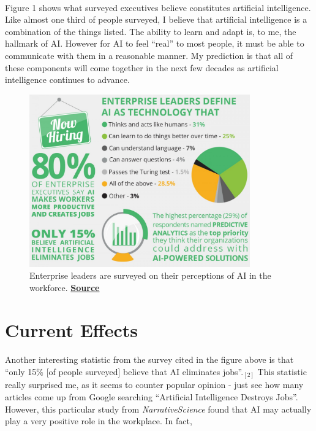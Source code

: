 \documentclass{article}
\begin{document}
    \paragraph{}
      Figure 1 shows what surveyed executives believe constitutes artificial
      intelligence. Like almost one third of people surveyed, I believe that
      artificial intelligence is a combination of the things listed. The ability
      to learn and adapt is, to me, the hallmark of AI. However for AI to feel
      ``real'' to most people, it must be able to communicate with them in a
      reasonable manner. My prediction is that all of these components will come
      together in the next few decades as artificial intelligence continues to
      advance.\\

      \begin{figure}[ht]
        \centering
        \captionsetup{width=.85\linewidth}
        \includegraphics[width=0.85\textwidth,height=\textheight, keepaspectratio]{Figure1}
        \caption{Enterprise leaders are surveyed on their perceptions of AI in the workforce.
                 \href{http://thumbnails-visually.netdna-ssl.com/artificial-intelligence-is-not-killing-jobs_557b4376e27b8_w1500.jpg}
                 {\textbf{Source}}}
      \end{figure}

  \cleardoublepage

  \section{Current Effects}
    \paragraph{}
      Another interesting statistic from the survey cited in the figure above is
      that ``only 15\% [of people surveyed] believe that AI eliminates jobs''.$_{[2]}$
      This statistic really surprised me, as it seems to counter popular opinion
      - just see how many articles come up from Google searching ``Artificial Intelligence
      Destroys Jobs''. However, this particular study from \textit{NarrativeScience}
      found that AI may actually play a very positive role in the workplace. In
      fact, \\
\end{document}
